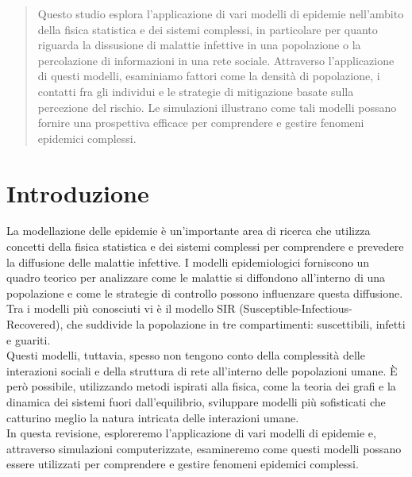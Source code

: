 \documentclass{article}
\title{}
\author{Thomas Del Moro}
\begin{document}
    \maketitle
    \begin{abstract}
        Questo studio esplora l'applicazione di vari modelli di epidemie nell'ambito della fisica statistica e dei
        sistemi complessi, in particolare per quanto riguarda la dissusione di malattie infettive in una popolazione o
        la percolazione di informazioni in una rete sociale.
        Attraverso l'applicazione di questi modelli, esaminiamo fattori come la densità di popolazione, i contatti fra
        gli individui e le strategie di mitigazione basate sulla percezione del rischio.
        Le simulazioni illustrano come tali modelli possano fornire una prospettiva efficace per comprendere e gestire
        fenomeni epidemici complessi.
    \end{abstract}


    \section{Introduzione}
    La modellazione delle epidemie è un'importante area di ricerca che utilizza concetti della fisica statistica e dei
    sistemi complessi per comprendere e prevedere la diffusione delle malattie infettive.
    I modelli epidemiologici forniscono un quadro teorico per analizzare come le malattie si diffondono all'interno di
    una popolazione e come le strategie di controllo possono influenzare questa diffusione.
    Tra i modelli più conosciuti vi è il modello SIR (Susceptible-Infectious-Recovered), che suddivide la popolazione
    in tre compartimenti: suscettibili, infetti e guariti.\\
    Questi modelli, tuttavia, spesso non tengono conto della complessità delle interazioni sociali e della struttura di
    rete all'interno delle popolazioni umane.
    È però possibile, utilizzando metodi ispirati alla fisica, come la teoria
    dei grafi e la dinamica dei sistemi fuori dall'equilibrio, sviluppare modelli più sofisticati che catturino meglio
    la natura intricata delle interazioni umane.\\
    In questa revisione, esploreremo l'applicazione di vari modelli di epidemie e, attraverso simulazioni computerizzate,
    esamineremo come questi modelli possano essere utilizzati per comprendere e gestire fenomeni epidemici complessi.
\end{document}
